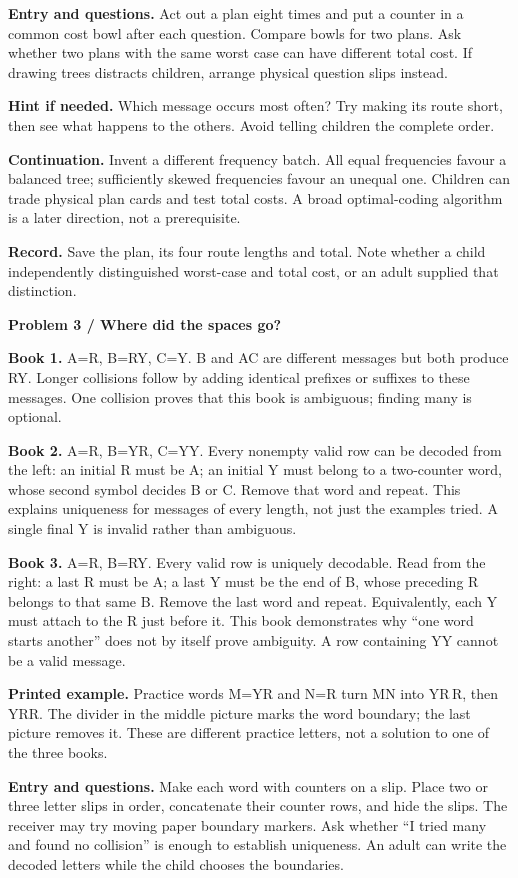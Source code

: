 \documentclass[11pt]{article}
\newcommand{\parttitle}[1]{{\large\bfseries\color{ink}#1}\par}
\newcommand{\labelled}[2]{\textbf{#1} #2\par}
\begin{document}
\labelled{Entry and questions.}{Act out a plan eight times and put a counter in a common cost bowl after each question. Compare bowls for two plans. Ask whether two plans with the same worst case can have different total cost. If drawing trees distracts children, arrange physical question slips instead.}
\labelled{Hint if needed.}{Which message occurs most often? Try making its route short, then see what happens to the others. Avoid telling children the complete order.}
\labelled{Continuation.}{Invent a different frequency batch. All equal frequencies favour a balanced tree; sufficiently skewed frequencies favour an unequal one. Children can trade physical plan cards and test total costs. A broad optimal-coding algorithm is a later direction, not a prerequisite.}
\labelled{Record.}{Save the plan, its four route lengths and total. Note whether a child independently distinguished worst-case and total cost, or an adult supplied that distinction.}
\newpage
\parttitle{Problem 3 / Where did the spaces go?}
\labelled{Book 1.}{A=R, B=RY, C=Y. B and AC are different messages but both produce RY. Longer collisions follow by adding identical prefixes or suffixes to these messages. One collision proves that this book is ambiguous; finding many is optional.}
\labelled{Book 2.}{A=R, B=YR, C=YY. Every nonempty valid row can be decoded from the left: an initial R must be A; an initial Y must belong to a two-counter word, whose second symbol decides B or C. Remove that word and repeat. This explains uniqueness for messages of every length, not just the examples tried. A single final Y is invalid rather than ambiguous.}
\labelled{Book 3.}{A=R, B=RY. Every valid row is uniquely decodable. Read from the right: a last R must be A; a last Y must be the end of B, whose preceding R belongs to that same B. Remove the last word and repeat. Equivalently, each Y must attach to the R just before it. This book demonstrates why ``one word starts another'' does not by itself prove ambiguity. A row containing YY cannot be a valid message.}
\labelled{Printed example.}{Practice words M=YR and N=R turn MN into YR\,R, then YRR. The divider in the middle picture marks the word boundary; the last picture removes it. These are different practice letters, not a solution to one of the three books.}
\labelled{Entry and questions.}{Make each word with counters on a slip. Place two or three letter slips in order, concatenate their counter rows, and hide the slips. The receiver may try moving paper boundary markers. Ask whether ``I tried many and found no collision'' is enough to establish uniqueness. An adult can write the decoded letters while the child chooses the boundaries.}
\end{document}
